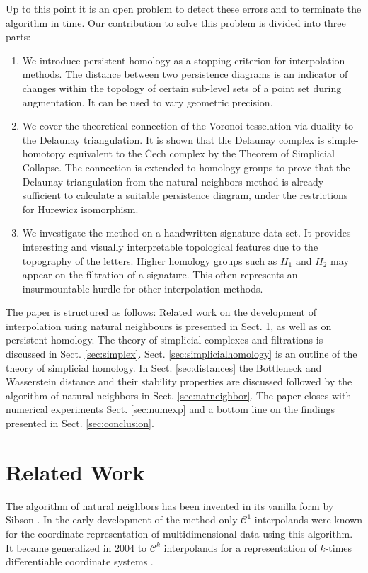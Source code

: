 \documentclass[journal]{IEEEtran}
\begin{document}
Up to this point it is an open problem to detect these errors and to terminate the algorithm in time. Our contribution to solve this problem is divided into three parts:
\begin{enumerate}
  \item We introduce persistent homology as a stopping-criterion for interpolation methods. The distance between two persistence diagrams is an indicator of changes within the topology of certain sub-level sets of a point set during augmentation. It can be used to vary geometric precision.

  \item We cover the theoretical connection of the Voronoi tesselation via duality to the Delaunay triangulation. It is shown that the Delaunay complex is simple-homotopy equivalent to the \v{C}ech complex by the Theorem of Simplicial Collapse. The connection is extended to homology groups to prove that the Delaunay triangulation from the natural neighbors method is already sufficient to calculate a suitable persistence diagram, under the restrictions for Hurewicz isomorphism.

  \item We investigate the method on a handwritten signature data set. It provides interesting and visually interpretable topological features due to the topography of the letters. Higher homology groups such as $H_1$ and $H_2$ may appear on the filtration of a signature. This often represents an insurmountable hurdle for other interpolation methods.
\end{enumerate}

The paper is structured as follows: Related work on the development of interpolation using natural neighbours is presented in Sect. \ref{sec:relatedwork}, as well as on persistent homology. The theory of simplicial complexes and filtrations is discussed in Sect. \ref{sec:simplex}. Sect. \ref{sec:simplicialhomology} is an outline of the theory of simplicial homology. In Sect. \ref{sec:distances} the Bottleneck and Wasserstein distance and their stability properties are discussed followed by the algorithm of natural neighbors in Sect. \ref{sec:natneighbor}. The paper closes with numerical experiments Sect. \ref{sec:numexp} and a bottom line on the findings presented in Sect. \ref{sec:conclusion}.

\section{Related Work}
\label{sec:relatedwork}
The algorithm of natural neighbors has been invented in its vanilla form by Sibson \cite{Sibson}. In the early development of the method only $\mathcal{C}^1$ interpolands were known for the coordinate representation of multidimensional data using this algorithm. It became generalized in $2004$ to $\mathcal{C}^k$ interpolands for a representation of $k$-times differentiable coordinate systems \cite{HiyoshiS04}.
\end{document}
